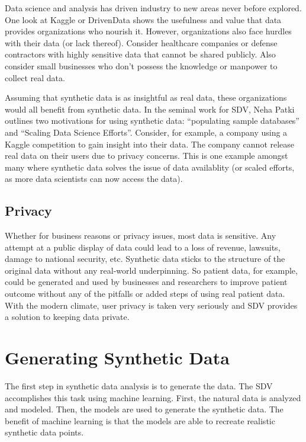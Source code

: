 Data science and analysis has driven industry to new areas never before
explored. One look at Kaggle or DrivenData shows the usefulness and value
that data provides organizations who nourish it. However, organizations
also face hurdles with their data (or lack thereof). Consider healthcare
companies or defense contractors with highly sensitive data that cannot
be shared publicly. Also consider small businesses who don't possess the
knowledge or manpower to collect real data.

Assuming that synthetic data is as insightful as real data, these organizations
would all benefit from synthetic data. In the seminal work for SDV, Neha
Patki outlines two motivations for using synthetic data: ``populating
sample databases'' and ``Scaling Data Science Efforts''\cite{}. Consider,
for example, a company using a Kaggle competition to gain insight into their
data. The company cannot release real data on their users due to privacy
concerns. This is one example amongst many where synthetic data solves the
issue of data availablity (or scaled efforts, as more data scientists can
now access the data). %

\subsection{Privacy}

Whether for business reasons or privacy issues, most data is sensitive. Any
attempt at a public display of data could lead to a loss of revenue, lawsuits,
damage to national security, etc. Synthetic data sticks to the structure
of the original data without any real-world underpinning. So patient data,
for example, could be generated and used by businesses and researchers to
improve patient outcome without any of the pitfalls or added steps of using
real patient data. With the modern climate, user privacy is taken very
seriously and SDV provides a solution to keeping data private. %

\section{Generating Synthetic Data}

The first step in synthetic data analysis is to generate the data. The SDV
accomplishes this task using machine learning. First, the natural data is
analyzed and modeled. Then, the models are used to generate the synthetic
data. The benefit of machine learning is that the models are able to recreate
realistic synthetic data points.

